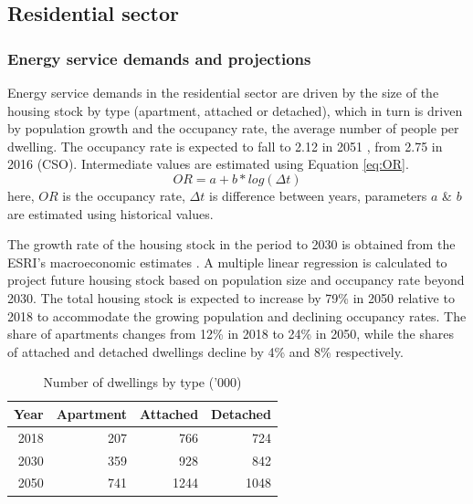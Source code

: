 \documentclass[journal abbreviation, manuscript]{copernicus}
\begin{document}
\clearpage

\subsection{Residential sector}
\label{ss:residential}
\subsubsection{Energy service demands and projections}
Energy service demands in the residential sector are driven by the size of the housing stock by type (apartment, attached or detached), which in turn is driven by population growth and the occupancy rate, the average number of people per dwelling. The occupancy rate is expected to fall to 2.12 in 2051 \citep{PropertyIndustryIreland2019}, from 2.75 in 2016 (CSO). Intermediate values are estimated using Equation \ref{eq:OR}.
\begin{equation}
\label{eq:OR}
 OR= a+b*log(\Delta t)
\end{equation}
here, $OR$ is the occupancy rate, $\Delta t$ is difference between years, parameters $a$ \& $b$ are estimated using historical values. 

The growth rate of the housing stock in the period to 2030 is obtained from the ESRI's macroeconomic estimates \citep{Yakut2020}. 
A multiple linear regression is calculated to project future housing stock based on population size and occupancy rate beyond 2030. The total housing stock is expected to increase by 79\% in 2050 relative to 2018 to accommodate the growing population and declining occupancy rates. The share of apartments changes from 12\% in 2018 to 24\% in 2050, while the shares of attached and detached dwellings decline by 4\% and 8\% respectively.

\begin{table}[htbp]
 \centering
 \footnotesize
 \caption{Number of dwellings by type ('000)}
 \begin{tabular}{rrrr}
 \hline
 \multicolumn{1}{l}{Year} & \multicolumn{1}{l}{Apartment} & \multicolumn{1}{l}{Attached} & \multicolumn{1}{l}{Detached} \\ \hline
 2018 & 207 & 766 & 724 \\
 2030 & 359 & 928 & 842 \\
 2050 & 741 & 1244 & 1048 \\ \hline
 \end{tabular}%
 \label{tab:house}%
\end{table}%
\end{document}
